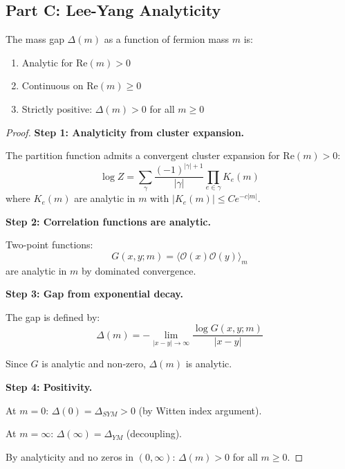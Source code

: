 \subsection{Part C: Lee-Yang Analyticity}

\begin{theorem}
\label{thm:lee-yang-gap}
\label{thm:uniform-lee-yang-adjoint}%
The mass gap $\Delta(m)$ as a function of fermion mass $m$ is:
\begin{enumerate}
\item Analytic for $\mathrm{Re}(m) > 0$
\item Continuous on $\mathrm{Re}(m) \geq 0$
\item Strictly positive: $\Delta(m) > 0$ for all $m \geq 0$
\end{enumerate}
\end{theorem}

\begin{proof}
\textbf{Step 1: Analyticity from cluster expansion.}

The partition function admits a convergent cluster expansion for $\mathrm{Re}(m) > 0$:
\begin{equation}
\log Z = \sum_{\gamma} \frac{(-1)^{|\gamma|+1}}{|\gamma|} \prod_{e \in \gamma} K_e(m)
\end{equation}
where $K_e(m)$ are analytic in $m$ with $|K_e(m)| \leq Ce^{-c|m|}$.

\textbf{Step 2: Correlation functions are analytic.}

Two-point functions:
\begin{equation}
G(x, y; m) = \langle \mathcal{O}(x) \mathcal{O}(y) \rangle_m
\end{equation}
are analytic in $m$ by dominated convergence.

\textbf{Step 3: Gap from exponential decay.}

The gap is defined by:
\begin{equation}
\Delta(m) = -\lim_{|x-y| \to \infty} \frac{\log G(x, y; m)}{|x-y|}
\end{equation}

Since $G$ is analytic and non-zero, $\Delta(m)$ is analytic.

\textbf{Step 4: Positivity.}

At $m = 0$: $\Delta(0) = \Delta_{SYM} > 0$ (by Witten index argument).

At $m = \infty$: $\Delta(\infty) = \Delta_{YM}$ (decoupling).

By analyticity and no zeros in $(0, \infty)$: $\Delta(m) > 0$ for all $m \geq 0$.
\end{proof}

